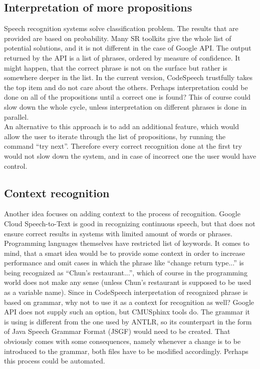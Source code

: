 \subsection{Interpretation of more propositions}
Speech recognition systems solve classification problem. The results that are provided are based on probability. Many SR toolkits give the whole list of potential solutions, and it is not different in the case of Google API. The output returned by the API is a list of phrases, ordered by measure of confidence. It might happen, that the correct phrase is not on the surface but rather is somewhere deeper in the list. In the current version, CodeSpeech trustfully takes the top item and do not care about the others. Perhaps interpretation could be done on all of the propositions until a correct one is found? This of course could slow down the whole cycle, unless interpretation on different phrases is done in parallel. \\
An alternative to this approach is to add an additional feature, which would allow the user to iterate through the list of propositions, \eg by running the command ``try next''. Therefore every correct recognition done at the first try would not slow down the system, and in case of incorrect one the user would have control.

\subsection{Context recognition}
Another idea focuses on adding context to the process of recognition. Google Cloud Speech-to-Text is good in recognizing continuous speech, but that does not ensure correct results in systems with limited amount of words or phrases. Programming languages themselves have restricted list of keywords. It comes to mind, that a smart idea would be to provide some context in order to increase performance and omit cases in which the phrase like ``change return type...'' is being recognized as ``Chun's restaurant...'', which of course in the programming world does not make any sense (unless Chun's restaurant is supposed to be used as a variable name). Since in CodeSpeech interpretation of recognized phrase is based on grammar, why not to use it as a context for recognition as well?  Google API does not supply such an option, but CMUSphinx tools do. The grammar it is using is different from the one used by ANTLR, so its counterpart in the form of Java Speech Grammar Format (JSGF) would need to be created. That obviously comes with some consequences, namely whenever a change is to be introduced to the grammar, both files have to be modified accordingly. Perhaps this process could be automated.  

